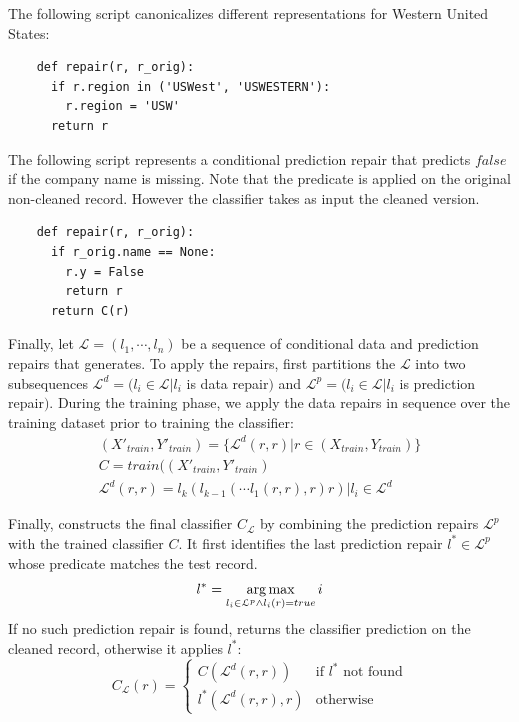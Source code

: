 \begin{example}\sloppy
The following script canonicalizes different representations for Western United States:
{\small\begin{verbatim}
    def repair(r, r_orig):
      if r.region in ('USWest', 'USWESTERN'):
        r.region = 'USW'
      return r
\end{verbatim}}
\end{example}

\vspace{0.25em}
\begin{example}\sloppy
The following script represents a conditional prediction repair that predicts $false$ if the company name is missing.  Note that the predicate is applied on the original non-cleaned record. However the classifier takes as input the cleaned version.
{\small\begin{verbatim}
    def repair(r, r_orig):
      if r_orig.name == None:
        r.y = False
        return r
      return C(r)
\end{verbatim}}
\end{example}

\noindent Finally, let $\mathcal{L} = (l_1,\cdots,l_n)$ be a sequence of conditional data and prediction repairs that \sys generates. To apply the repairs, \sys first partitions the $\mathcal{L}$ into two subsequences $\mathcal{L}^d = (l_i \in \mathcal{L} | l_i$ is data repair$)$ and $\mathcal{L}^p = (l_i \in \mathcal{L} | l_i$ is prediction repair$)$.  During the training phase, we apply the data repairs in sequence over the training dataset prior to training the classifier:
\begin{align}
(X'_{train}, Y'_{train}) = \{\mathcal{L}^d(r, r) | r \in (X_{train}, Y_{train}) \}\\
C = train((X'_{train}, Y'_{train})\\
\mathcal{L}^d(r, r) = l_k(l_{k-1}(\cdots l_1(r, r), r) r) | l_i \in \mathcal{L}^d
\end{align}

Finally, \sys constructs the final classifier $C_{\mathcal{L}}$ by combining the prediction repairs $\mathcal{L}^p$ with the trained classifier $C$.  It first identifies the last prediction repair $l^* \in \mathcal{L}^p$ whose predicate matches the test record.  
$$l^* = \operatorname*{arg\,max}_{l_i \in \mathcal{L}^p \wedge l_i(r) = true} i$$
If no such prediction repair is found, \sys  returns the classifier prediction on the cleaned record, otherwise it applies $l^*$:
$$C_{\mathcal{L}}(r) = \begin{cases}
    C(\mathcal{L}^d(r, r))& \text{if } l^*\textrm{\ not\ found}\\
    l^*(\mathcal{L}^d(r, r), r) & \text{otherwise}
\end{cases}$$

